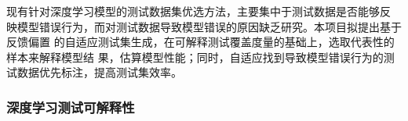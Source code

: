 {\kaishu 现有针对深度学习模型的测试数据集优选方法，主要集中于测试数据是否能够反
映模型错误行为，而对测试数据导致模型错误的原因缺乏研究。本项目拟提出基于反馈偏置
的自适应测试集生成，在可解释测试覆盖度量的基础上，选取代表性的样本来解释模型结
果，估算模型性能；同时，自适应找到导致模型错误行为的测试数据优先标注，提高测试集效率。}










\subsubsection{深度学习测试可解释性}

\iffalse
	Zhang等人~\citess{zhang2021duo}提出了一种结合模糊测试和差分生成输入的深度学习框架测试方法Duo，用于解释和评估TensorFlow、PyTorch、MNN、MXNet等深度学习框架；也提出了一种基于模糊测试的算子级精度测试方法Predoo~\citess{zhang2021predoo}，用于估计TensorFlow中单个深度学习算子的精度误差。
	Hu等人~\citess{Hu2019DeepMutationPlusPlus}提出了一种基于变异测试的DNN工具DeepMutation++，用于对包括前馈神经网络(FNN)和有状态循环神经网络(RNN)在内的DNN的质量评估，不仅可以静态分析DNN模型对整个输入的鲁棒性，还可以通过运行时分析识别顺序输入的易受攻击部分。
	Xie等人~\citess{Xie2019DiffChaser}提出了一种自动黑盒测试框架DiffChaser，用于检测深度学习模型在量化、压缩前后的非目标或目标不一致性。
	Du等人~\citess{Du2020Marble}提出了的方法Marble构建了一个概率模型，通过抽象来紧凑表征RNN的鲁棒性，用于对基于RNN的深度学习系统进行定量的鲁棒性分析。

	Luo等人~\citess{luo2021graph}将算子级别的覆盖指标引入图论，提出了一种基于图的模糊测试方法来捕捉深度学习框架异常、提高深度学习框架质量和可解释性的方法。
	Du等人~\citess{Du2019DeepStellar}~\citess{Du2019AQuantitative}提出了一个基于对抗性样本检测和覆盖引导测试生成的深度学习模型测试方法DeepStellar，基于两个轨迹相似性指标和五个覆盖充分性指标对循环神经网络（RNN）进行定量分析和可解释性研究。
	Lee等人~\citess{Lee2020Effective}提出了一种对神经网络进行白盒测试的新方法Adapt，通过使神经元选择策略不断地自适应正在进行的测试状态，增强了深度神经网络的可解释性，在覆盖率和对抗性输入方面有有效表现。
	Wang等人~\citess{wang2020deepsonar}提出一种识别AI合成假声音的方法DeepSonar，利用对分层神经元激活模式学习来增强深度神经网络在语音识别方面的可解释性，推测真实和AI合成的假声音之间的细微差异，同时也对操纵攻击（例如语音转换和附加现实世界噪声）的情况具有鲁棒性。
\fi



